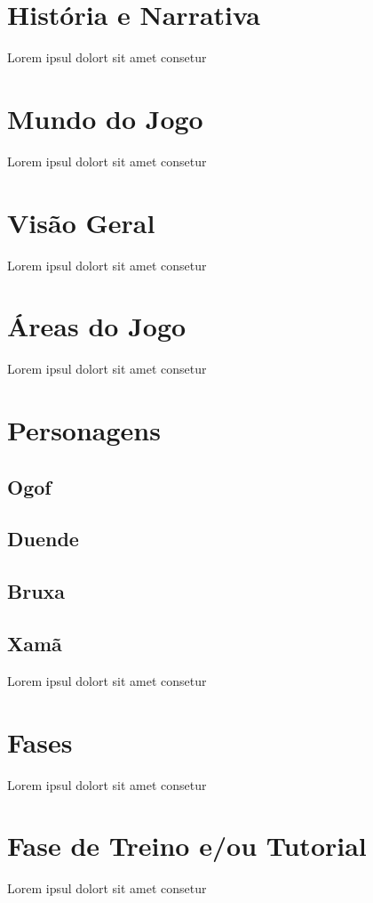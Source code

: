 
\section{História e Narrativa}

Lorem ipsul dolort sit amet consetur

\section{Mundo do Jogo}

Lorem ipsul dolort sit amet consetur


\section{Visão Geral}

Lorem ipsul dolort sit amet consetur

\section{Áreas do Jogo}

Lorem ipsul dolort sit amet consetur


\section{Personagens}

\subsection{Ogof}
\subsection{Duende}
\subsection{Bruxa}
\subsection{Xamã}

Lorem ipsul dolort sit amet consetur

\section{Fases}

Lorem ipsul dolort sit amet consetur


\section{Fase de Treino e/ou Tutorial}

Lorem ipsul dolort sit amet consetur
